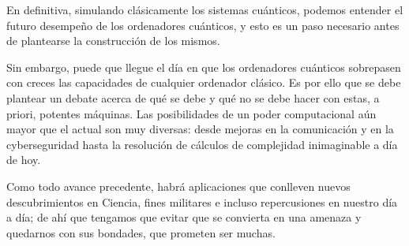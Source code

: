 \documentclass[11pt,a4paper,twoside,pdf]{article}
\numberwithin{equation}{section}
\begin{document}
En definitiva, simulando clásicamente los sistemas cuánticos, podemos entender el futuro desempeño de los ordenadores cuánticos, y esto es un paso necesario antes de plantearse la construcción de los mismos.
 
Sin embargo, puede que llegue el día en que los ordenadores cuánticos sobrepasen con creces las capacidades de cualquier ordenador clásico. Es por ello que se debe plantear un debate acerca de qué se debe y qué no se debe hacer con estas, a priori, potentes máquinas. Las posibilidades de un poder computacional aún mayor que el actual son muy diversas: desde mejoras en la comunicación y en la cyberseguridad hasta la resolución de cálculos de complejidad inimaginable a día de hoy. 

Como todo avance precedente, habrá aplicaciones que conlleven nuevos descubrimientos en Ciencia, fines militares e incluso repercusiones en nuestro día a día; de ahí que tengamos que evitar que se convierta en una amenaza y quedarnos con sus bondades, que prometen ser muchas.







\newpage

\end{document}
